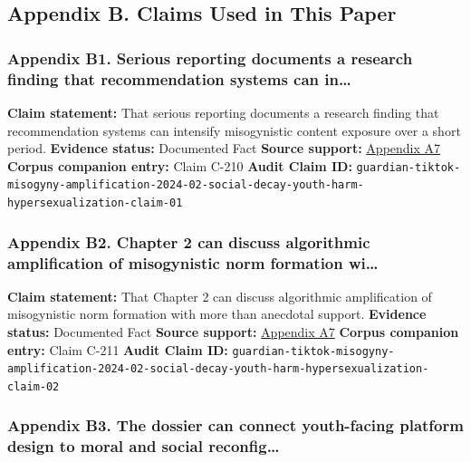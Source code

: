\documentclass[
  american,
  11pt,
  letterpaper,
]{article}
\begin{document}
\subsection{Appendix B. Claims Used in This
Paper}\label{appendix-b.-claims-used-in-this-paper-2}

\subsubsection{Appendix B1. Serious reporting documents a research
finding that recommendation systems can
in\ldots{}}\label{ch-02-appendix-b1-serious-reporting-documents-a-research-finding-that-recommendation-systems-can-in}

\textbf{Claim statement:} That serious reporting documents a research
finding that recommendation systems can intensify misogynistic content
exposure over a short period. \textbf{Evidence status:} Documented Fact
\textbf{Source support:}
\hyperref[ch-02-appendix-a7-social-media-algorithms-amplifying-misogynistic-content]{Appendix
A7} \textbf{Corpus companion entry:} Claim C-210 \textbf{Audit Claim
ID:}
\texttt{guardian-tiktok-misogyny-amplification-2024-02-social-decay-youth-harm-hypersexualization-claim-01}

\subsubsection{Appendix B2. Chapter 2 can discuss algorithmic
amplification of misogynistic norm formation
wi\ldots{}}\label{ch-02-appendix-b2-chapter-2-can-discuss-algorithmic-amplification-of-misogynistic-norm-formation-wi}

\textbf{Claim statement:} That Chapter 2 can discuss algorithmic
amplification of misogynistic norm formation with more than anecdotal
support. \textbf{Evidence status:} Documented Fact \textbf{Source
support:}
\hyperref[ch-02-appendix-a7-social-media-algorithms-amplifying-misogynistic-content]{Appendix
A7} \textbf{Corpus companion entry:} Claim C-211 \textbf{Audit Claim
ID:}
\texttt{guardian-tiktok-misogyny-amplification-2024-02-social-decay-youth-harm-hypersexualization-claim-02}

\subsubsection{Appendix B3. The dossier can connect youth-facing
platform design to moral and social
reconfig\ldots{}}\label{ch-02-appendix-b3-the-dossier-can-connect-youth-facing-platform-design-to-moral-and-social-reconfig}
\end{document}
